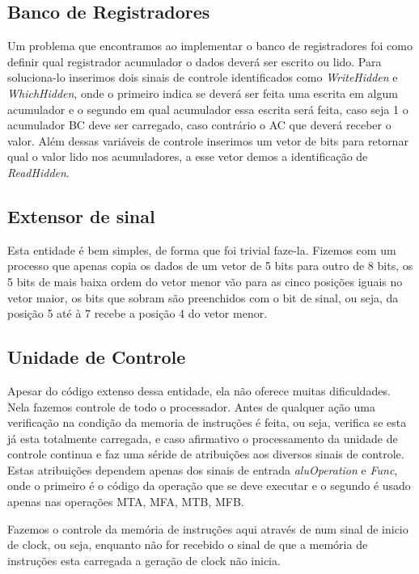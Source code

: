 \documentclass[12pt]{article}
\begin{document}
\subsection{Banco de Registradores}

Um problema que encontramos ao implementar o banco de registradores foi como definir qual registrador acumulador o dados deverá ser escrito ou lido. Para soluciona-lo inserimos dois sinais de controle identificados como \textit{WriteHidden} e \textit{WhichHidden}, onde o primeiro indica se deverá ser feita uma escrita em algum acumulador e o segundo em qual acumulador essa escrita será feita, caso seja 1 o acumulador BC deve ser carregado, caso contrário o AC que deverá receber o valor. Além dessas variáveis de controle inserimos um vetor de bits para retornar qual o valor lido nos acumuladores, a esse vetor demos a identificação de \textit{ReadHidden}.

\subsection{Extensor de sinal}

Esta entidade é bem simples, de forma que foi trivial faze-la. Fizemos com um processo que apenas copia os dados de um vetor de 5 bits para outro de 8 bits, os 5 bits de mais baixa ordem do vetor menor vão para as cinco posições iguais no vetor maior, os bits que sobram são preenchidos com o bit de sinal, ou seja, da posição 5 até à 7 recebe a posição 4 do vetor menor.

\subsection{Unidade de Controle}

Apesar do código extenso dessa entidade, ela não oferece muitas dificuldades. Nela fazemos controle de todo o processador. Antes de qualquer ação uma verificação na condição da memoria de instruções é feita, ou seja, verifica se esta já esta totalmente carregada, e caso afirmativo o processamento da unidade de controle continua e faz uma séride de atribuições aos diversos sinais de controle. Estas atribuições dependem apenas dos sinais de entrada \textit{aluOperation} e \textit{Func}, onde o primeiro é o código da operação que se deve executar e o segundo é usado apenas nas operações MTA, MFA, MTB, MFB.

Fazemos o controle da memória de instruções aqui através de num sinal de inicio de clock, ou seja, enquanto não for recebido o sinal de que a memória de instruções esta carregada a geração de clock não inicia.
\end{document}
